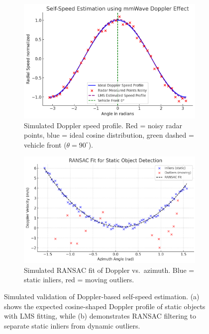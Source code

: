 \begin{figure}[!htbp]
    \centering
    \begin{subfigure}{0.48\linewidth}
        \centering
        \includegraphics[width=\linewidth]{images/Self_Speed_Doppler.png}
        \caption{Simulated Doppler speed profile.  
        Red = noisy radar points, blue = ideal cosine distribution, green dashed = vehicle front ($\theta=90^\circ$).}
        \label{fig:self_speed_doppler}
    \end{subfigure}
    \hfill
    \begin{subfigure}{0.48\linewidth}
        \centering
        \includegraphics[width=\linewidth]{images/RANSAC.png}
        \caption{Simulated RANSAC fit of Doppler vs.\ azimuth.  
        Blue = static inliers, red = moving outliers.}
        \label{fig:ransac_simulated}
    \end{subfigure}
    \caption{Simulated validation of Doppler-based self-speed estimation.  
    (a) shows the expected cosine-shaped Doppler profile of static objects with LMS fitting,  
    while (b) demonstrates RANSAC filtering to separate static inliers from dynamic outliers.}
    \label{fig:simulated_doppler_ransac}
\end{figure}


